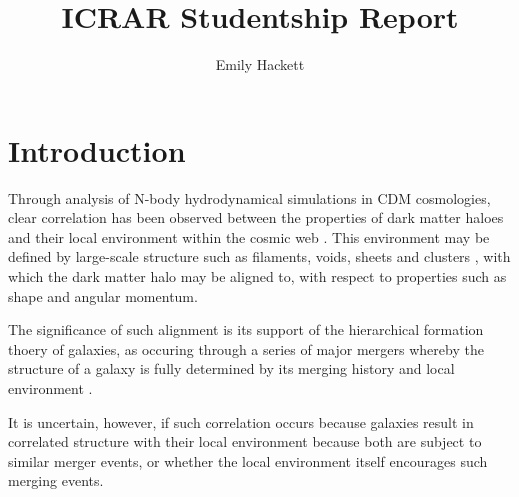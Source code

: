 \documentclass[a4paper,fleqn,usenatbib,useAMS]{mnras}
\title[ICRAR Report]{ICRAR Studentship Report}
\author[E. Hackett]{Emily Hackett}
\begin{document}
\label{firstpage}
\maketitle

\section{Introduction}
Through analysis of N-body hydrodynamical simulations in CDM cosmologies, clear correlation has been observed between the properties of dark matter haloes and their local environment within the cosmic web \cite{lemson99}. This environment may be defined by large-scale structure such as filaments, voids, sheets and clusters \cite{hahn07a} \cite{bailin05}, with which the dark matter halo may be aligned to, with respect to properties such as shape and angular momentum.

The significance of such alignment is its support of the hierarchical formation thoery of galaxies, as occuring through a series of major mergers whereby the structure of a galaxy is fully determined by its merging history and local environment \cite{lemson99}.

It is uncertain, however, if such correlation occurs because galaxies result in correlated structure with their local environment because both are subject to similar merger events, or whether the local environment itself encourages such merging events.


\end{document}
